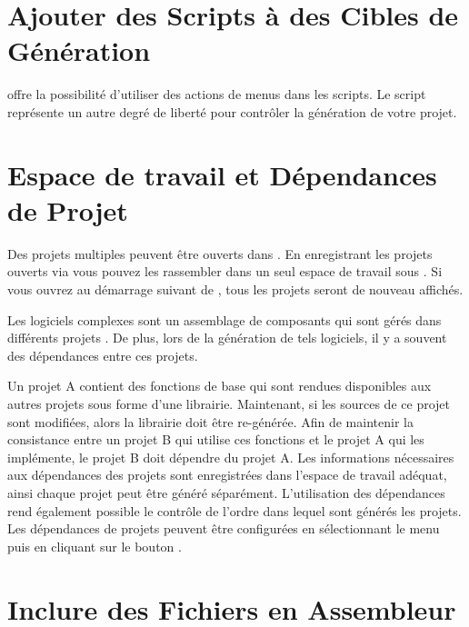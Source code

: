 \section{Ajouter des Scripts à des Cibles de Génération}

\codeblocks offre la possibilité d'utiliser des actions de menus dans les scripts. Le script représente un autre degré de liberté pour contrôler la génération de votre projet.


\section{Espace de travail et Dépendances de Projet}

Des projets multiples peuvent être ouverts dans \codeblocks. En enregistrant les projets ouverts via   vous pouvez les rassembler dans un seul espace de travail sous . Si vous ouvrez  au démarrage suivant de \codeblocks, tous les projets seront de nouveau affichés.

Les logiciels complexes sont un assemblage de composants qui sont gérés dans différents projets \codeblocks. De plus, lors de la génération de tels logiciels, il y a souvent des dépendances entre ces projets.


Un projet A contient des fonctions de base qui sont rendues disponibles aux autres projets sous forme d'une librairie. Maintenant, si les sources de ce projet sont modifiées, alors la librairie doit être re-générée. Afin de maintenir la consistance entre un projet B qui utilise ces fonctions et le projet A qui les implémente, le projet B doit dépendre du projet A. Les informations nécessaires aux dépendances des projets sont enregistrées dans l'espace de travail adéquat, ainsi chaque projet peut être généré séparément. L'utilisation des dépendances rend également possible le contrôle de l'ordre dans lequel sont générés les projets. Les dépendances de projets peuvent être configurées en sélectionnant le menu  puis en cliquant sur le bouton .

\section{Inclure des Fichiers en Assembleur}

